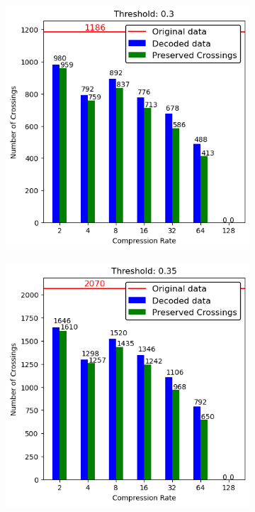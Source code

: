 \begin{appendices}
\begin{figure}
	\ContinuedFloat
	\begin{subfigure}{.5\textwidth}
		\includegraphics[width=\textwidth]{../../Images/spikes_threshold_03.png}
	\end{subfigure}
	\begin{subfigure}{.5\textwidth}
		\includegraphics[width=\textwidth]{../../Images/spikes_threshold_035.png}

\end{subfigure}
\end{figure}
\end{appendices}
